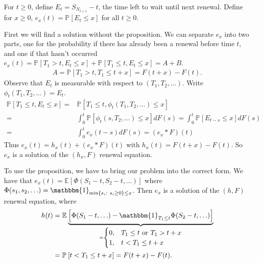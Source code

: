 \begin{ex}[Application 2]
	For $t\geq 0$, define $E_t = S_{N_{t+1}}-t${\color{blue}, the time left to wait until next renewal}. Define for  $x \geq 0$, $e_x(t) = \mathbb{P}_{} \left[ E_t \leq x \right] $ for all $t\geq 0$. 

	{\color{blue} First we will find a solution without the proposition. We can separate $e_x$ into two parts, one for the probability if there has already been a renewal before time $t$, and one if that hasn't occurred $e_x(t) = \mathbb{P}_{} \left[ T_1 > t, E_t \leq x \right]  + \mathbb{P}_{} \left[ T_1 \leq t, E_t \leq x \right]  = A + B$.
\begin{align}
	A = \mathbb{P}_{} \left[ T_1 > t, T_1 \leq t+x \right] = F(t+x)-F(t).
\end{align}
Observe that $E_t$ is measurable with respect to $(T_1, T_2, \ldots)$. Write $\phi_t(T_1,T_2, \ldots )=E_t$. 
\begin{align}
	\mathbb{P}_{} \left[ T_1 \leq t, E_t \leq x \right] =& \mathbb{P}_{} \left[ T_1 \leq t, \phi_t(T_1,T_2, \ldots ) \leq x \right] \\ 
	=& \int_{0}^{t} \mathbb{P}_{} \left[ \phi_t(s, T_2, \ldots ) \leq x \right] dF(s) = \int_{0}^{t} \mathbb{P}_{} \left[ E_{t-s} \leq x \right] dF(s) \\
	=& \int_{0}^{t} e_x(t-s) dF(s) = (e_x * F)(t)
\end{align}
Thus $e_x(t) = h_x(t) + (e_x * F)(t)$ with $h_x(t) = F(t+x)-F(t)$. So  $e_x$ is a solution of the $(h_x,F)$ renewal equation.
}

{\color{blue}To use the proposition, we have to bring our problem into the correct form. }We have that $e_x(t) = \mathbb{E}_{} \left[ \Phi(S_1-t, S_2-t,\ldots) \right] $ where $\Phi(s_1, s_2,\ldots) = \mathbbm{1}_{\min\{s_i:\ s_i\geq 0\}\leq x}$. Then $e_x$ is a solution of the $(h,F)$ renewal equation, where
\begin{align}
h(t) &= \mathbb{E}_{} \underbrace{\left[ \Phi(S_1 -t,\ldots) - \mathbbm{1}_{T_1\leq t}\Phi(S_2-t,\ldots) \right] }_{=
\begin{cases}
	0, &T_1\leq t \textrm{ or } T_1>t+x \\
	1, & t<T_1\leq t+x
\end{cases}
} \\
&= \mathbb{P}_{} \left[ t<T_1 \leq t+x \right] = F(t+x)-F(t).
\end{align}

\end{ex}


